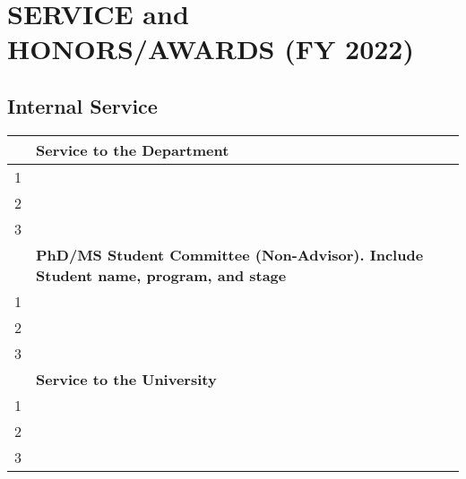 \documentclass[11pt]{article}
\newcommand{\fy}{2022}
\begin{document}
\newpage
\section{SERVICE and HONORS/AWARDS (FY \fy{})}

\subsection{Internal Service}

  \begin{tabular}{ll}
    \toprule
    \textbf{}& \textbf{Service to the Department}\\
      \midrule
    1& \\
    2& \\
    3& \\
    \toprule
    \textbf{}& \textbf{PhD/MS Student Committee (Non-Advisor). Include Student name, program, and stage}\\
      \midrule
    1& \\
    2& \\
    3& \\
    \toprule
    \textbf{}& \textbf{Service to the University}\\
      \midrule
    1& \\
    2& \\
    3& \\
    \bottomrule
  \end{tabular}


\end{document}

